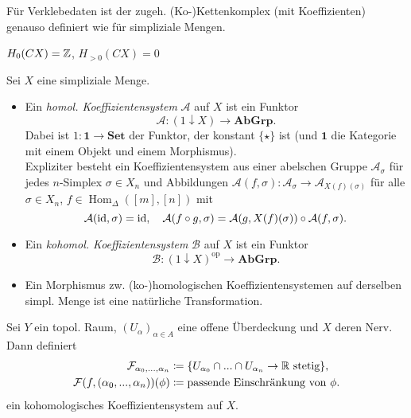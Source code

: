 \documentclass{cheat-sheet}
\newcommand{\SetC}{\mathbf{Set}} %
\newcommand{\AbGrp}{\mathbf{AbGrp}} %
\newcommand{\op}{\mathrm{op}} %
\DeclareMathOperator{\Hom}{Hom} %
\begin{document}
\begin{defn}
  Für Verklebedaten ist der zugeh. (Ko-)Kettenkomplex (mit Koeffizienten) genauso definiert wie für simpliziale Mengen.
\end{defn}

\begin{prop}
  $H_0(CX) = \mathbb{Z}$, $H_{>0}(CX) = 0$
\end{prop}



\begin{defn}
  Sei $X$ eine simpliziale Menge.
  \begin{itemize}
    \item Ein \emph{homol. Koeffizientensystem} $\mathcal{A}$ auf $X$ ist ein Funktor
    \[ \mathcal{A} : (1 \downarrow X) \to \AbGrp. \]
    Dabei ist $1 : \mathbf{1} \to \SetC$ der Funktor, der konstant $\{ \star \}$ ist (und $\mathbf{1}$ die Kategorie mit einem Objekt und einem Morphismus).\\
    Expliziter besteht ein Koeffizientensystem aus einer abelschen Gruppe $\mathcal{A}_\sigma$ für jedes $n$-Simplex $\sigma \in X_n$ und Abbildungen $\mathcal{A}(f, \sigma) : \mathcal{A}_\sigma \to \mathcal{A}_{X(f)(\sigma)}$ für alle $\sigma \in X_n$, $f \in \Hom_{\Delta}([m], [n])$ mit
    \[
      \mathcal{A}(\mathrm{id}, \sigma) = \mathrm{id}, \quad
      \mathcal{A}(f \circ g, \sigma) = \mathcal{A}(g, X(f)(\sigma)) \circ \mathcal{A}(f, \sigma).
    \]
    \item Ein \emph{kohomol. Koeffizientensystem} $\mathcal{B}$ auf $X$ ist ein Funktor
    \[ \mathcal{B} : (1 \downarrow X)^\op \to \AbGrp. \]
    \item Ein Morphismus zw. (ko-)homologischen Koeffizientensystemen auf derselben simpl. Menge ist eine natürliche Transformation.
  \end{itemize}
\end{defn}


\begin{bsp}
  Sei $Y$ ein topol. Raum, $(U_\alpha)_{\alpha \in A}$ eine offene Überdeckung und $X$ deren Nerv. Dann definiert
  \begin{align*}
    \mathcal{F}_{\alpha_0, ..., \alpha_n} & \coloneqq \{ U_{\alpha_0} \cap ... \cap U_{\alpha_n} \to \mathbb{R} \text{ stetig} \}, \\
    \mathcal{F}(f, (\alpha_0, ..., \alpha_n))(\phi) & \coloneqq \text{passende Einschränkung von $\phi$}.
  \end{align*}
  ein kohomologisches Koeffizientensystem auf $X$.
\end{bsp}
\end{document}
